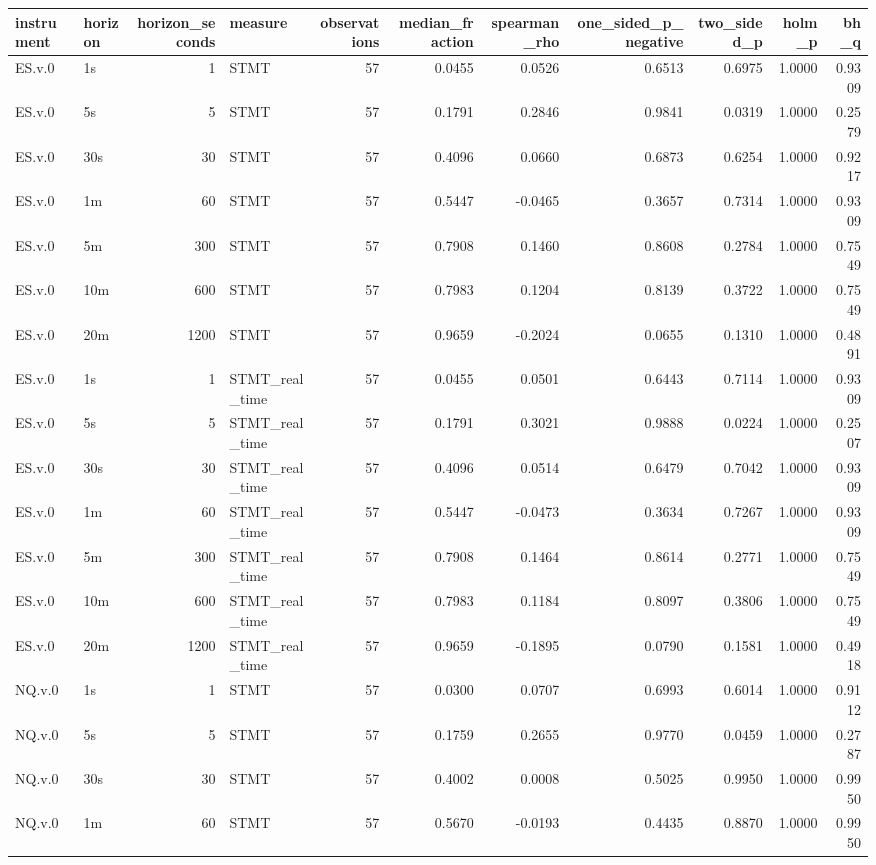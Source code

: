 \begin{tabular}{llrlrrrrrrr}
\toprule
instrument & horizon & horizon_seconds & measure & observations & median_fraction & spearman_rho & one_sided_p_negative & two_sided_p & holm_p & bh_q \\
\midrule
ES.v.0 & 1s & 1 & STMT & 57 & 0.0455 & 0.0526 & 0.6513 & 0.6975 & 1.0000 & 0.9309 \\
ES.v.0 & 5s & 5 & STMT & 57 & 0.1791 & 0.2846 & 0.9841 & 0.0319 & 1.0000 & 0.2579 \\
ES.v.0 & 30s & 30 & STMT & 57 & 0.4096 & 0.0660 & 0.6873 & 0.6254 & 1.0000 & 0.9217 \\
ES.v.0 & 1m & 60 & STMT & 57 & 0.5447 & -0.0465 & 0.3657 & 0.7314 & 1.0000 & 0.9309 \\
ES.v.0 & 5m & 300 & STMT & 57 & 0.7908 & 0.1460 & 0.8608 & 0.2784 & 1.0000 & 0.7549 \\
ES.v.0 & 10m & 600 & STMT & 57 & 0.7983 & 0.1204 & 0.8139 & 0.3722 & 1.0000 & 0.7549 \\
ES.v.0 & 20m & 1200 & STMT & 57 & 0.9659 & -0.2024 & 0.0655 & 0.1310 & 1.0000 & 0.4891 \\
ES.v.0 & 1s & 1 & STMT_real_time & 57 & 0.0455 & 0.0501 & 0.6443 & 0.7114 & 1.0000 & 0.9309 \\
ES.v.0 & 5s & 5 & STMT_real_time & 57 & 0.1791 & 0.3021 & 0.9888 & 0.0224 & 1.0000 & 0.2507 \\
ES.v.0 & 30s & 30 & STMT_real_time & 57 & 0.4096 & 0.0514 & 0.6479 & 0.7042 & 1.0000 & 0.9309 \\
ES.v.0 & 1m & 60 & STMT_real_time & 57 & 0.5447 & -0.0473 & 0.3634 & 0.7267 & 1.0000 & 0.9309 \\
ES.v.0 & 5m & 300 & STMT_real_time & 57 & 0.7908 & 0.1464 & 0.8614 & 0.2771 & 1.0000 & 0.7549 \\
ES.v.0 & 10m & 600 & STMT_real_time & 57 & 0.7983 & 0.1184 & 0.8097 & 0.3806 & 1.0000 & 0.7549 \\
ES.v.0 & 20m & 1200 & STMT_real_time & 57 & 0.9659 & -0.1895 & 0.0790 & 0.1581 & 1.0000 & 0.4918 \\
NQ.v.0 & 1s & 1 & STMT & 57 & 0.0300 & 0.0707 & 0.6993 & 0.6014 & 1.0000 & 0.9112 \\
NQ.v.0 & 5s & 5 & STMT & 57 & 0.1759 & 0.2655 & 0.9770 & 0.0459 & 1.0000 & 0.2787 \\
NQ.v.0 & 30s & 30 & STMT & 57 & 0.4002 & 0.0008 & 0.5025 & 0.9950 & 1.0000 & 0.9950 \\
NQ.v.0 & 1m & 60 & STMT & 57 & 0.5670 & -0.0193 & 0.4435 & 0.8870 & 1.0000 & 0.9950 \\

\end{tabular}
